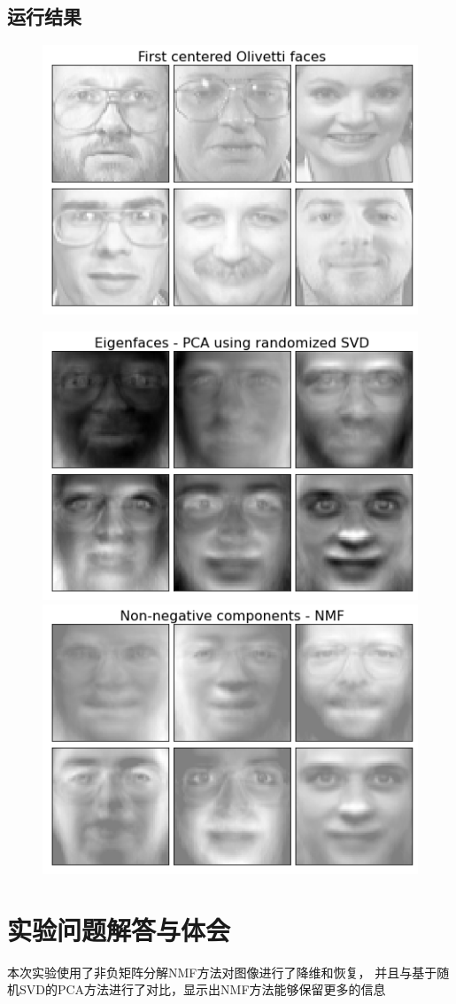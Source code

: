 \documentclass[a4paper]{ctexart}
\begin{document}
  \subsection{运行结果}
  \begin{figure}[H]
    \includegraphics[width=1.0\textwidth]{fig/1.png}
  \end{figure}
  \newpage
  \begin{figure}[H]
    \includegraphics[width=1.0\textwidth]{fig/2.png}
    \includegraphics[width=1.0\textwidth]{fig/3.png}
  \end{figure}

  \section{实验问题解答与体会}
    本次实验使用了非负矩阵分解NMF方法对图像进行了降维和恢复，
    并且与基于随机SVD的PCA方法进行了对比，显示出NMF方法能够保留更多的信息
\end{document}
